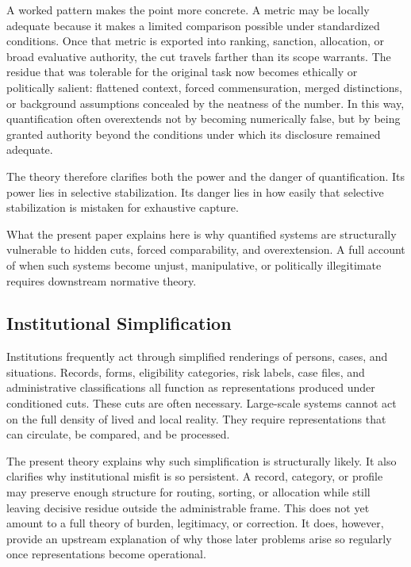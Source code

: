 \documentclass[11pt]{article}
\begin{document}
A worked pattern makes the point more concrete. A metric may be locally adequate because it makes a limited comparison possible under standardized conditions. Once that metric is exported into ranking, sanction, allocation, or broad evaluative authority, the cut travels farther than its scope warrants. The residue that was tolerable for the original task now becomes ethically or politically salient: flattened context, forced commensuration, merged distinctions, or background assumptions concealed by the neatness of the number. In this way, quantification often overextends not by becoming numerically false, but by being granted authority beyond the conditions under which its disclosure remained adequate. \cite{espeland_stevens_quantification,merry_seductions_of_quantification,porter_trust_in_numbers}

The theory therefore clarifies both the power and the danger of quantification. Its power lies in selective stabilization. Its danger lies in how easily that selective stabilization is mistaken for exhaustive capture.

What the present paper explains here is why quantified systems are structurally vulnerable to hidden cuts, forced comparability, and overextension. A full account of when such systems become unjust, manipulative, or politically illegitimate requires downstream normative theory.

\subsection{Institutional Simplification}

Institutions frequently act through simplified renderings of persons, cases, and situations. Records, forms, eligibility categories, risk labels, case files, and administrative classifications all function as representations produced under conditioned cuts. These cuts are often necessary. Large-scale systems cannot act on the full density of lived and local reality. They require representations that can circulate, be compared, and be processed. \cite{scott_seeing_like_a_state,star_ethnography_of_infrastructure,bowker_star_sorting_things_out,herd_moynihan_administrative_burden}

The present theory explains why such simplification is structurally likely. It also clarifies why institutional misfit is so persistent. A record, category, or profile may preserve enough structure for routing, sorting, or allocation while still leaving decisive residue outside the administrable frame. This does not yet amount to a full theory of burden, legitimacy, or correction. It does, however, provide an upstream explanation of why those later problems arise so regularly once representations become operational. \cite{bowker_star_sorting_things_out,herd_moynihan_administrative_burden}
\end{document}
